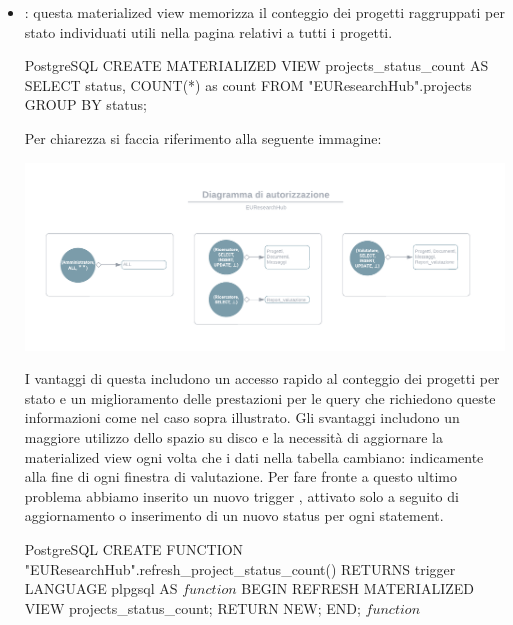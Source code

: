 \documentclass{report}
\begin{document}
\begin{itemize}
\item {}: questa materialized view memorizza il conteggio dei progetti raggruppati per stato individuati utili nella pagina relativi a tutti i progetti. \\

\begin{minipage}{\linewidth}
\begin{imtaCode}{PostgreSQL}
CREATE MATERIALIZED VIEW projects_status_count AS
SELECT status, COUNT(*) as count
FROM "EUResearchHub".projects
GROUP BY status;
\end{imtaCode}
\end{minipage}

Per chiarezza si faccia riferimento alla seguente immagine:
\begin{center}
\includegraphics[scale = 0.7]{1.pdf}
\end{center}
I vantaggi di questa includono un accesso rapido al conteggio dei progetti per stato e un miglioramento delle prestazioni per le query che richiedono queste informazioni come nel caso sopra illustrato. Gli svantaggi includono un maggiore utilizzo dello spazio su disco e la necessità di aggiornare la materialized view ogni volta che i dati nella tabella  cambiano: indicamente alla fine di ogni finestra di valutazione.  Per fare fronte a questo ultimo problema abbiamo inserito un nuovo trigger , attivato solo a seguito di aggiornamento o inserimento di un nuovo status per ogni statement.  \\

\begin{minipage}{\linewidth}
\begin{imtaCode}{PostgreSQL}
CREATE FUNCTION "EUResearchHub".refresh_project_status_count()
 RETURNS trigger
 LANGUAGE plpgsql
AS $function$
BEGIN
  REFRESH MATERIALIZED VIEW projects_status_count;
  RETURN NEW;
END;
$function$

\end{imtaCode}
\end{minipage}



\end{itemize}
\end{document}
